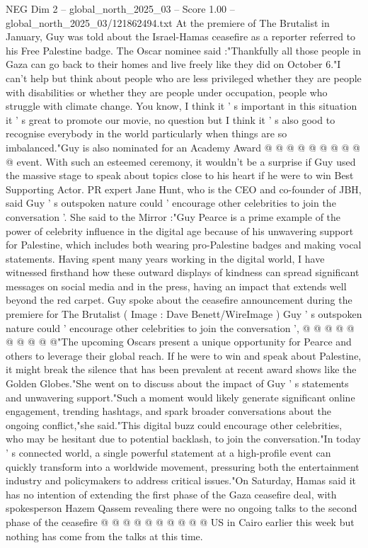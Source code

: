 \begin{textsample}{NEG Dim 2 – global\_north\_2025\_03 – Score 1.00 – global\_north\_2025\_03/121862494.txt}
At the premiere of The Brutalist in January, Guy was told about the Israel-Hamas ceasefire as a reporter referred to his Free Palestine badge.
The Oscar nominee said :"Thankfully all those people in Gaza can go back to their homes and live freely like they did on October 6."I can't help but think about people who are less privileged whether they are people with disabilities or whether they are people under occupation, people who struggle with climate change.
You know, I think it ' s important in this situation it ' s great to promote our movie, no question but I think it ' s also good to recognise everybody in the world particularly when things are so imbalanced."Guy is also nominated for an Academy Award @ @ @ @ @ @ @ @ @ @ event.
With such an esteemed ceremony, it wouldn't be a surprise if Guy used the massive stage to speak about topics close to his heart if he were to win Best Supporting Actor.
PR expert Jane Hunt, who is the CEO and co-founder of JBH, said Guy ' s outspoken nature could ' encourage other celebrities to join the conversation '.
She said to the Mirror :"Guy Pearce is a prime example of the power of celebrity influence in the digital age because of his unwavering support for Palestine, which includes both wearing pro-Palestine badges and making vocal statements.
Having spent many years working in the digital world, I have witnessed firsthand how these outward displays of kindness can spread significant messages on social media and in the press, having an impact that extends well beyond the red carpet.
Guy spoke about the ceasefire announcement during the premiere for The Brutalist ( Image : Dave Benett/WireImage ) Guy ' s outspoken nature could ' encourage other celebrities to join the conversation ', @ @ @ @ @ @ @ @ @ @"The upcoming Oscars present a unique opportunity for Pearce and others to leverage their global reach.
If he were to win and speak about Palestine, it might break the silence that has been prevalent at recent award shows like the Golden Globes."She went on to discuss about the impact of Guy ' s statements and unwavering support."Such a moment would likely generate significant online engagement, trending hashtags, and spark broader conversations about the ongoing conflict,"she said."This digital buzz could encourage other celebrities, who may be hesitant due to potential backlash, to join the conversation."In today ' s connected world, a single powerful statement at a high-profile event can quickly transform into a worldwide movement, pressuring both the entertainment industry and policymakers to address critical issues."On Saturday, Hamas said it has no intention of extending the first phase of the Gaza ceasefire deal, with spokesperson Hazem Qassem revealing there were no ongoing talks to the second phase of the ceasefire @ @ @ @ @ @ @ @ @ @ US in Cairo earlier this week but nothing has come from the talks at this time.

\end{textsample}
